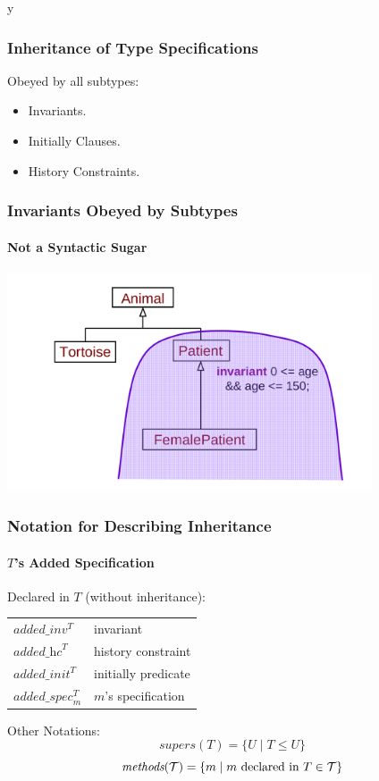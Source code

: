 \if y\MAKEHANDOUTS \documentclass[t,compress,landscape,handout]{beamer}
\newcommand{\STO}{\ensuremath{\leq}}
\newcommand{\spec}{{\textit{spec}}}
\newcommand{\inv}{{\textit{inv}}}
\newcommand{\hc}{{\textit{hc}}}
\newcommand{\init}{{\textit{init}}}
\newcommand{\added}[1]{{\textit{added}}\_#1}
\newcommand{\addedspec}{\added{\spec}}
\newcommand{\addedinv}{\added{\inv}}
\newcommand{\addedhc}{\added{\hc}}
\newcommand{\addedinit}{\added{\init}}
\newcommand{\supers}{\textit{supers}}
\newcommand{\methods}{\textit{methods}}
\begin{document}
\begin{frame}
\frametitle{Inheritance of Type Specifications}

Obeyed by all subtypes:
\begin{itemize}
\item
Invariants.

\item
Initially Clauses.

\item
History Constraints.
\end{itemize}
\end{frame}

\begin{frame}
\frametitle{Invariants Obeyed by Subtypes}
\framesubtitle{Not a Syntactic Sugar}
\includegraphics[width=4.25in]{invariant-inh}
\end{frame}

\begin{frame}
\frametitle{Notation for Describing Inheritance}
\framesubtitle{$T$'s Added Specification}

Declared in $T$ (without inheritance):
\begin{center}
\begin{tabular}{ll}
$\addedinv^T$ & invariant \\
$\addedhc^T$ & history constraint\\
$\addedinit^T$ & initially predicate \\
$\addedspec^T_m$ & $m$'s specification \\
\end{tabular}
\end{center}

Other Notations:
\begin{displaymath}
\supers(T) = \{U \mid T \STO U\}
\end{displaymath}
\begin{displaymath}
\methods({\cal T}) = \{m \mid m \mbox{ declared in } T \in {\cal T}\}
\end{displaymath}
\end{frame}
\end{document}
